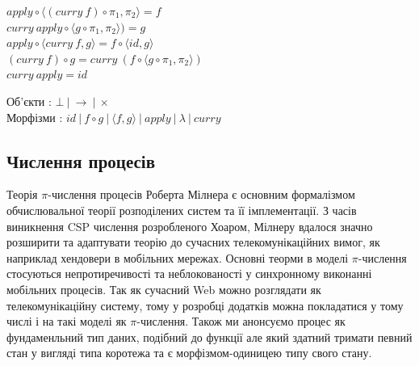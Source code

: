 \documentclass[11pt,oneside]{article}
\begin{document}
\begingroup
\parbox[t][][l]{0.40\textwidth}{

\begin{prooftree}
\end{prooftree}

\begin{prooftree}
\end{prooftree}

\begin{prooftree}
\end{prooftree}

}
\hspace{0.1cm}
\parbox[t][][r]{0.60\textwidth}{

\begin{center}
$apply \circ \langle (curry\ f) \circ \pi_1 , \pi_2 \rangle = f$\\
$curry\ apply \circ \langle g \circ \pi_1, \pi_2 \rangle) = g$\\
$apply \circ \langle curry\ f, g \rangle = f \circ \langle id , g\rangle$\\
$(curry\ f) \circ g = curry\ (f \circ \langle g \circ \pi_1,\pi_2\rangle)$\\
$curry\ apply = id$\\
\end{center}

\begin{center}
Об’єкти : $\bot\ |\ \rightarrow\ |\ \times$\\
Морфізми : $id\ |\ f \circ g\ |\ \langle f, g \rangle\ |\ apply\ |\ \lambda\ |\ curry$
\end{center}

}
\endgroup

\newpage
    \subsection{Числення процесів}
    Теорія $\pi$-числення процесів Роберта Мілнера є основним формалізмом обчислювальної
    теорії розподілених систем та її імплементації. З часів виникнення CSP числення розробленого Хоаром,
    Мілнеру вдалося значно розширити та адаптувати теорію до сучасних
    телекомунікаційних вимог, як наприклад хендовери в мобільних мережах.
    Основні теорми в моделі $\pi$-числення стосуються непротиречивості та неблокованості
    у синхронному виконанні мобільних процесів. Так як сучасний Web можно розглядати
    як телекомунікаційну систему, тому у розробці додатків можна покладатися у тому
    числі і на такі моделі як $\pi$-числення.
    Також ми анонсуємо процес як фундаменльний тип даних, подібний до функції але який здатний
    тримати певний стан у вигляді типа коротежа та є морфізмом-одиницею типу свого стану.
\end{document}
